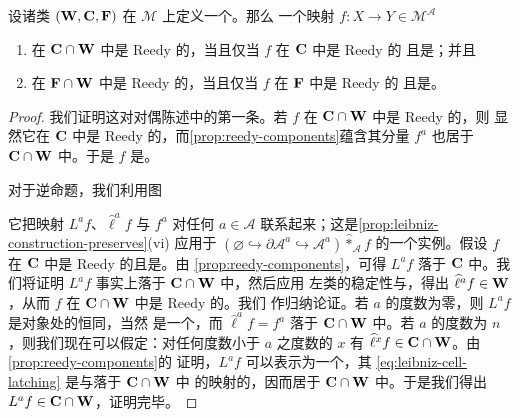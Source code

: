 \begin{lemma}\label{lem:reedy-cw-pointwise-we}
设诸类 $(\mathbf{W},\mathbf{C},\mathbf{F})$ 在 $\mathcal{M}$ 上定义一个\trModelStructure。那么
一个映射 $f\colon X\to Y\in\mathcal{M}^{\mathcal{A}}$
\begin{enumerate}[label=(\roman*)]
\item 在 $\mathbf{C}\cap\mathbf{W}$ 中是 Reedy 的，当且仅当 $f$ 在 $\mathbf{C}$ 中是 Reedy 的
  且是\trPointwise{}\trWeakEquivalence；并且
\item 在 $\mathbf{F}\cap\mathbf{W}$ 中是 Reedy 的，当且仅当 $f$ 在 $\mathbf{F}$ 中是 Reedy 的
  且是\trPointwise{}\trWeakEquivalence。
\end{enumerate}
\end{lemma}

\begin{proof}
我们证明这对对偶陈述中的第一条。若 $f$ 在 $\mathbf{C}\cap\mathbf{W}$ 中是 Reedy 的，则
显然它在 $\mathbf{C}$ 中是 Reedy 的，而\cref{prop:reedy-components}蕴含其分量
$f^{a}$ 也居于 $\mathbf{C}\cap\mathbf{W}$ 中。于是 $f$ 是\trPointwise{}\trWeakEquivalence。

对于逆命题，我们利用图
\begin{center}
\end{center}
它把映射 $L^{a}f$、$\widehat{\ell}^{a}f$ 与 $f^{a}$ 对任何 $a\in\mathcal{A}$
联系起来；这是\cref{prop:leibniz-construction-preserves}(vi) 应用于
$(\varnothing\hookrightarrow\partial\mathcal{A}^{a}\hookrightarrow\mathcal{A}^{a})\mathbin{\widehat{\ast}}_{\mathcal{A}}f$ 的一个实例。假设 $f$
在 $\mathbf{C}$ 中是 Reedy 的且是\trPointwise{}\trWeakEquivalence。由%
\cref{prop:reedy-components}，可得 $L^{a}f$ 落于 $\mathbf{C}$ 中。我们将证明
$L^{a}f$ 事实上落于 $\mathbf{C}\cap\mathbf{W}$ 中，然后应用\trWeakFactorizationSystem{}%
左类的\trPushout{}稳定性与\trTwoOfThreeProperty，得出
$\widehat{\ell}^{a}f\in\mathbf{W}$，从而 $f$ 在 $\mathbf{C}\cap\mathbf{W}$ 中是 Reedy 的。我们
作归纳论证。若 $a$ 的度数为零，则 $L^{a}f$ 是\trInitial{}对象处的恒同，当然
是一个\trWeakEquivalence，而 $\widehat{\ell}^{a}f=f^{a}$ 落于 $\mathbf{C}\cap\mathbf{W}$
中。若 $a$ 的度数为 $n$，则我们现在可以假定：对任何度数小于 $a$ 之度数的 $x$
有 $\widehat{\ell}^{x}f\in\mathbf{C}\cap\mathbf{W}$。由\cref{prop:reedy-components}的
证明，$L^{a}f$ 可以表示为一个\trCellComplex，其\trCell{}
\eqref{eq:leibniz-cell-latching} 是\trMonomorphism{}与落于 $\mathbf{C}\cap\mathbf{W}$ 中
的映射的\trLeibnizTensor，因而居于 $\mathbf{C}\cap\mathbf{W}$ 中。于是我们得出
$L^{a}f\in\mathbf{C}\cap\mathbf{W}$，证明完毕。
\end{proof}

